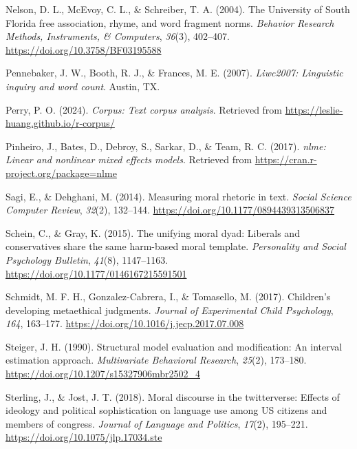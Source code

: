 \documentclass[
  man,floatsintext]{apa6}
\newlength{\cslhangindent}
\newenvironment{CSLReferences}[2] %
 {\begin{list}{}{%
  \setlength{\itemindent}{0pt}
  \setlength{\leftmargin}{0pt}
  \setlength{\parsep}{0pt}
  \ifodd #1
   \setlength{\leftmargin}{\cslhangindent}
   \setlength{\itemindent}{-1\cslhangindent}
  \fi
  \setlength{\itemsep}{#2\baselineskip}}}
 {\end{list}}
\begin{document}
\begin{CSLReferences}{1}{0}
Nelson, D. L., McEvoy, C. L., \& Schreiber, T. A. (2004). The University of South Florida free association, rhyme, and word fragment norms. \emph{Behavior Research Methods, Instruments, \& Computers}, \emph{36}(3), 402--407. \url{https://doi.org/10.3758/BF03195588}

Pennebaker, J. W., Booth, R. J., \& Frances, M. E. (2007). \emph{{Liwc2007: Linguistic inquiry and word count}}. Austin, TX.

Perry, P. O. (2024). \emph{Corpus: Text corpus analysis}. Retrieved from \url{https://leslie-huang.github.io/r-corpus/}

Pinheiro, J., Bates, D., Debroy, S., Sarkar, D., \& Team, R. C. (2017). \emph{{nlme: Linear and nonlinear mixed effects models}}. Retrieved from \url{https://cran.r-project.org/package=nlme}

Sagi, E., \& Dehghani, M. (2014). Measuring moral rhetoric in text. \emph{Social Science Computer Review}, \emph{32}(2), 132--144. \url{https://doi.org/10.1177/0894439313506837}

Schein, C., \& Gray, K. (2015). The unifying moral dyad: Liberals and conservatives share the same harm-based moral template. \emph{Personality and Social Psychology Bulletin}, \emph{41}(8), 1147--1163. \url{https://doi.org/10.1177/0146167215591501}

Schmidt, M. F. H., Gonzalez-Cabrera, I., \& Tomasello, M. (2017). {Children's developing metaethical judgments}. \emph{Journal of Experimental Child Psychology}, \emph{164}, 163--177. \url{https://doi.org/10.1016/j.jecp.2017.07.008}

Steiger, J. H. (1990). Structural model evaluation and modification: An interval estimation approach. \emph{Multivariate Behavioral Research}, \emph{25}(2), 173--180. \url{https://doi.org/10.1207/s15327906mbr2502_4}

Sterling, J., \& Jost, J. T. (2018). Moral discourse in the twitterverse: Effects of ideology and political sophistication on language use among US citizens and members of congress. \emph{Journal of Language and Politics}, \emph{17}(2), 195--221. \url{https://doi.org/10.1075/jlp.17034.ste}


\end{CSLReferences}
\end{document}
